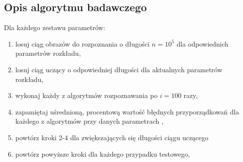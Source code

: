 	\subsection{Opis algorytmu badawczego}
	
	Dla każdego zestawu parametrów:
	\begin{enumerate}
	\item losuj ciąg obrazów do rozpoznania o długości $n = 10^5$ dla odpowiednich parametrów rozkładu,
	\item losuj ciąg uczący o odpowiedniej długości dla aktualnych parametrów rozkładu,
	\item wykonaj każdy z algorytmów rozpoznawania po $i = 100$  razy,
	\item zapamiętaj uśrednioną, procentową wartość błędnych przyporządkowań dla każdego z algorytmów przy danych parametrach ,
	\item powtórz kroki 2-4 dla zwiększających się długości ciągu uczącego
	\item powtórz powyższe kroki dla każdego przypadku testowego,
	\end{enumerate}